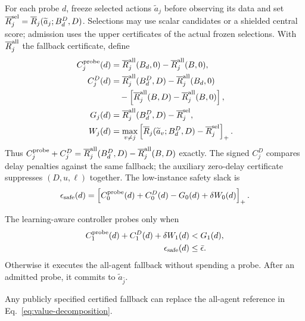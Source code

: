 \documentclass[journal]{IEEEtran}
\begin{document}
For each probe $d$, freeze selected actions $\widetilde a_j$ before observing its data and set $\overline R_j^{\rm sel}=\overline R_j(\widetilde a_j;B_d^D,D)$.
Selections may use scalar candidates or a shielded central score; admission uses the upper certificates of the actual frozen selections.
With $\overline R_j^{\rm all}$ the fallback certificate, define
\begin{align}
C_j^{\rm probe}(d)&=\overline R_j^{\rm all}(B_d,0)-\overline R_j^{\rm all}(B,0),\nonumber\\
C_j^D(d)&=\overline R_j^{\rm all}(B_d^D,D)-\overline R_j^{\rm all}(B_d,0)\nonumber\\
&\quad-\left[\overline R_j^{\rm all}(B,D)-\overline R_j^{\rm all}(B,0)\right],\nonumber\\
G_j(d)&=\overline R_j^{\rm all}(B_d^D,D)-\overline R_j^{\rm sel},\nonumber\\
W_j(d)&=\max_{v\ne j}\left[\overline R_j(\widetilde a_v;B_d^D,D)-\overline R_j^{\rm sel}\right]_+.
\label{eq:value-decomposition}
\end{align}
Thus $C_j^{\rm probe}+C_j^D=\overline R_j^{\rm all}(B_d^D,D)-\overline R_j^{\rm all}(B,D)$ exactly.
The signed $C_j^D$ compares delay penalties against the same fallback; the auxiliary zero-delay certificate suppresses $(D,u,\ell)$ together.
The low-instance safety slack is
\begin{equation}
\epsilon_{\rm safe}(d)=\left[C_0^{\rm probe}(d)+C_0^D(d)-G_0(d)+\delta W_0(d)\right]_+.
\label{eq:safety}
\end{equation}

The learning-aware controller probes only when
\begin{align}
C_1^{\rm probe}(d)+C_1^D(d)+\delta W_1(d)&<G_1(d),\nonumber\\
\epsilon_{\rm safe}(d)&\le\bar\epsilon.
\label{eq:admission}
\end{align}
Otherwise it executes the all-agent fallback without spending a probe.
After an admitted probe, it commits to $\widetilde a_{\widehat j}$.

Any publicly specified certified fallback can replace the all-agent reference in Eq.~\eqref{eq:value-decomposition}.
\end{document}
